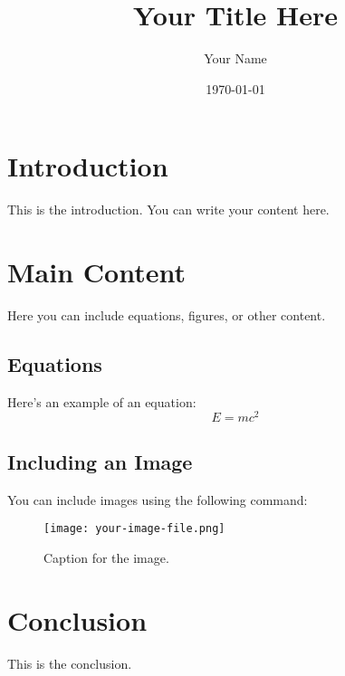 \documentclass{article} %
\title{Your Title Here} %
\author{Your Name} %
\date{\today} %
\begin{document}

\maketitle %

\section{Introduction} %
This is the introduction. You can write your content here.

\section{Main Content} %
Here you can include equations, figures, or other content.

\subsection{Equations} %
Here’s an example of an equation:
\begin{equation}
E = mc^2
\end{equation}

\subsection{Including an Image}
You can include images using the following command:
\begin{figure}[h]
    \centering
    \texttt{[image: your-image-file.png]}
    \caption{Caption for the image.}

\end{figure}

\section{Conclusion} %
This is the conclusion.
\end{document}
